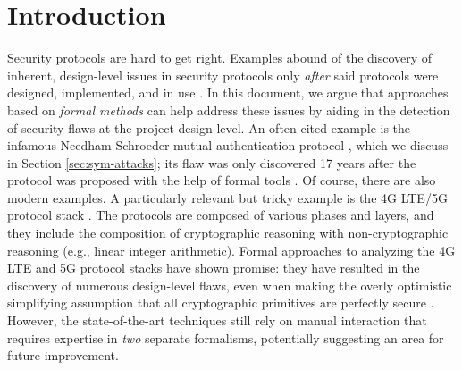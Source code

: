 \documentclass{article}
\theoremstyle{definition}
\newcommand{\note}[1]{\textcolor{red}{#1}}
\begin{document}
\section{Introduction}





Security protocols are hard to get right. Examples abound of the discovery of inherent, 
design-level issues in security protocols only \textit{after} said protocols were designed, implemented, 
and in use \cite{lteinspector,5greasoner,ns_attack}. 
In this document, we argue that approaches based on \emph{formal methods} can help address these issues 
by aiding in the detection of security flaws at the project design level.
An often-cited example is the infamous Needham-Schroeder mutual authentication protocol \cite{needham_schroeder}, 
which we discuss in Section \ref{sec:sym-attacks}; its flaw was only discovered 17 years after the protocol 
was proposed with the help of formal tools \cite{ns_attack}.
Of course, there are also modern examples. A particularly relevant but tricky example 
is the 4G LTE/5G protocol stack \cite{4g_lte,5g}. 
The protocols are composed of various phases and layers, and they include the composition of cryptographic reasoning 
with non-cryptographic reasoning (e.g., linear integer arithmetic). 
Formal approaches to analyzing the 4G LTE and 5G protocol stacks have shown promise: 
they have resulted in the discovery of numerous design-level flaws, 
even when making the overly optimistic simplifying assumption that all cryptographic primitives 
are perfectly secure \cite{lteinspector,5greasoner,dolev_yao}. 
However, the state-of-the-art techniques \cite{lteinspector,5greasoner} still rely on manual interaction 
that requires expertise in \emph{two} separate formalisms, potentially suggesting an area for future improvement.
\end{document}
